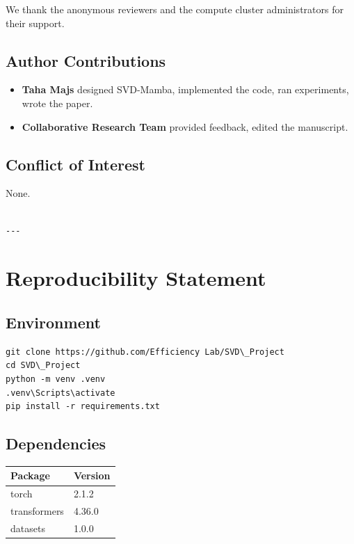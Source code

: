 We thank the anonymous reviewers and the compute cluster administrators for their support.

\subsection{Author Contributions}

\begin{itemize}
\item \textbf{Taha Majs} designed SVD-Mamba, implemented the code, ran
  experiments, wrote the paper.
\item \textbf{Collaborative Research Team} provided feedback, edited the manuscript.

\end{itemize}
\subsection{Conflict of Interest}

None.
\begin{lstlisting}

---
\end{lstlisting}


\section{Reproducibility Statement}

\subsection{Environment}

\begin{lstlisting}
git clone https://github.com/Efficiency Lab/SVD\_Project
cd SVD\_Project
python -m venv .venv
.venv\Scripts\activate
pip install -r requirements.txt
\end{lstlisting}

\subsection{Dependencies}

\begin{table}[H]
\centering
\small
\begin{tabular}{ll}
\toprule
\textbf{Package} & \textbf{Version} \\
\midrule
torch & 2.1.2 \\
transformers & 4.36.0 \\
datasets & 1.0.0 \\
\bottomrule
\end{tabular}
\end{table}

